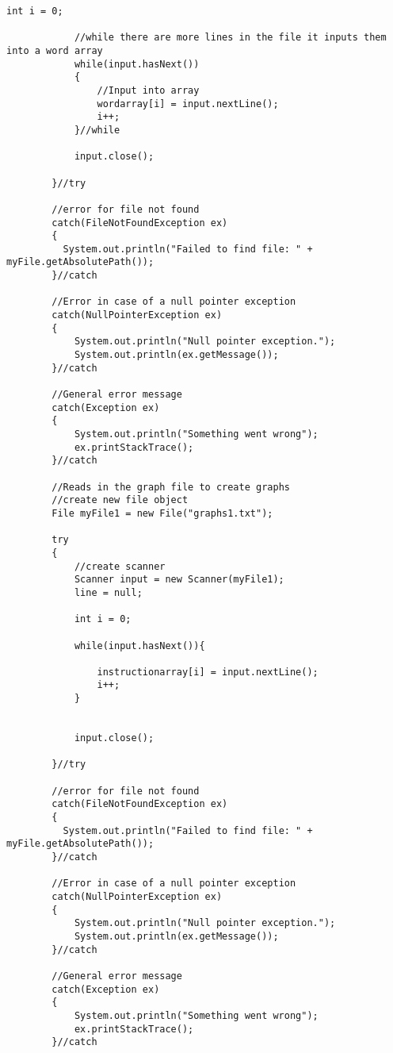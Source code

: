 \documentclass[letterpaper, 10pt,DIV=13]{scrartcl}
\numberwithin{equation}{section} %
\numberwithin{figure}{section} %
\numberwithin{table}{section} %
\begin{document}
\begin{lstlisting}[frame=single, ]
            int i = 0;

            //while there are more lines in the file it inputs them into a word array
            while(input.hasNext())
            {  
                //Input into array 
                wordarray[i] = input.nextLine();        
                i++;
            }//while

            input.close();  

        }//try
        
        //error for file not found
        catch(FileNotFoundException ex)
        {
          System.out.println("Failed to find file: " + myFile.getAbsolutePath()); 
        }//catch

        //Error in case of a null pointer exception
        catch(NullPointerException ex)
        {
            System.out.println("Null pointer exception.");
            System.out.println(ex.getMessage());
        }//catch

        //General error message
        catch(Exception ex)
        {
            System.out.println("Something went wrong");
            ex.printStackTrace();
        }//catch

        //Reads in the graph file to create graphs 
        //create new file object
        File myFile1 = new File("graphs1.txt");
        
        try
        {
            //create scanner
            Scanner input = new Scanner(myFile1);
            line = null;
            
            int i = 0;

            while(input.hasNext()){

                instructionarray[i] = input.nextLine();
                i++;
            }
  

            input.close();  

        }//try
        
        //error for file not found
        catch(FileNotFoundException ex)
        {
          System.out.println("Failed to find file: " + myFile.getAbsolutePath()); 
        }//catch

        //Error in case of a null pointer exception
        catch(NullPointerException ex)
        {
            System.out.println("Null pointer exception.");
            System.out.println(ex.getMessage());
        }//catch

        //General error message
        catch(Exception ex)
        {
            System.out.println("Something went wrong");
            ex.printStackTrace();
        }//catch



\end{lstlisting}
\end{document}
